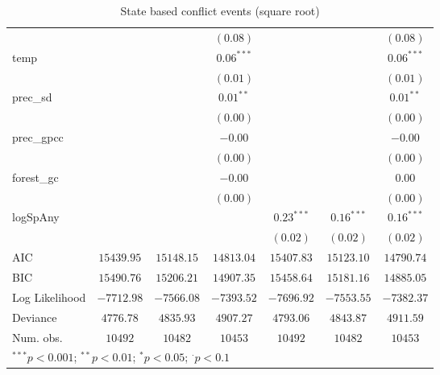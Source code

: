 \begin{sidewaystable}
\begin{center}
{\begin{tabular}{l c c c c c c}
                &               &                & $(0.08)$      &               &                & $(0.08)$      \\
temp            &               &                & $0.06^{***}$  &               &                & $0.06^{***}$  \\
                &               &                & $(0.01)$      &               &                & $(0.01)$      \\
prec\_sd        &               &                & $0.01^{**}$   &               &                & $0.01^{**}$   \\
                &               &                & $(0.00)$      &               &                & $(0.00)$      \\
prec\_gpcc      &               &                & $-0.00$       &               &                & $-0.00$       \\
                &               &                & $(0.00)$      &               &                & $(0.00)$      \\
forest\_gc      &               &                & $-0.00$       &               &                & $0.00$        \\
                &               &                & $(0.00)$      &               &                & $(0.00)$      \\
logSpAny        &               &                &               & $0.23^{***}$  & $0.16^{***}$   & $0.16^{***}$  \\
                &               &                &               & $(0.02)$      & $(0.02)$       & $(0.02)$      \\
\hline
AIC             & $15439.95$    & $15148.15$     & $14813.04$    & $15407.83$    & $15123.10$     & $14790.74$    \\
BIC             & $15490.76$    & $15206.21$     & $14907.35$    & $15458.64$    & $15181.16$     & $14885.05$    \\
Log Likelihood  & $-7712.98$    & $-7566.08$     & $-7393.52$    & $-7696.92$    & $-7553.55$     & $-7382.37$    \\
Deviance        & $4776.78$     & $4835.93$      & $4907.27$     & $4793.06$     & $4843.87$      & $4911.59$     \\
Num. obs.       & $10492$       & $10482$        & $10453$       & $10492$       & $10482$        & $10453$       \\
\hline
\multicolumn{7}{l}{\scriptsize{$^{***}p<0.001$; $^{**}p<0.01$; $^{*}p<0.05$; $^{\cdot}p<0.1$}}
\end{tabular}
}
\caption{State based conflict events (square root)}
\label{sqrtState_based}
\end{center}
\end{sidewaystable}
